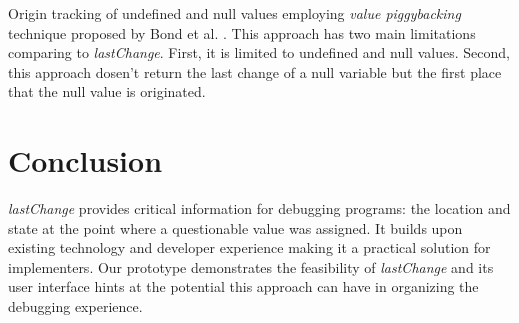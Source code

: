 \documentclass[preprint]{sigplanconf}
\begin{document}
Origin tracking of undefined and null values employing \textit{value piggybacking} technique proposed by
Bond et al. \cite{Bond}. This approach has two main limitations comparing to \textit{lastChange}.
First, it is limited to undefined and null values. Second, this approach dosen't return the last change
of a null variable but the first place that the null value is originated.

 


\section{Conclusion}
\textit{lastChange} provides critical information for debugging programs: the location and state at the point where a questionable value was assigned. It builds upon existing technology and developer experience making it a practical solution for implementers. Our prototype demonstrates the feasibility of \textit{lastChange} and its user interface hints at the potential this approach can have in organizing the debugging experience. 





\end{document}
